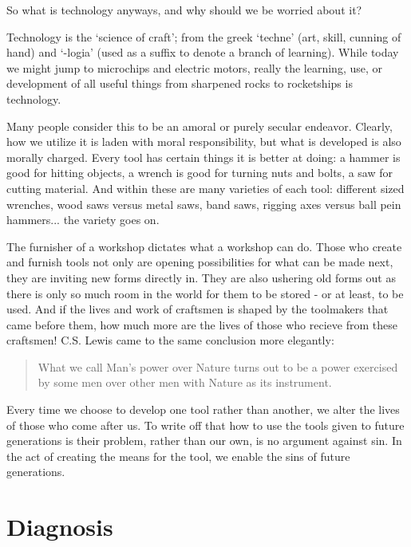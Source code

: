 \documentclass[letterpaper]{article}
\begin{document}
So what is technology anyways, and why should we be worried about it?

Technology is the `science of craft'; from the greek `techne' (art, skill, cunning of hand) and `-logia' (used as a suffix to denote a branch of learning). While today we might jump to microchips and electric motors, really the learning, use, or development of all useful things from sharpened rocks to rocketships is technology.

Many people consider this to be an amoral or purely secular endeavor. Clearly, how we utilize it is laden with moral responsibility, but what is developed is also morally charged. Every tool has certain things it is better at doing: a hammer is good for hitting objects, a wrench is good for turning nuts and bolts, a saw for cutting material. And within these are many varieties of each tool: different sized wrenches, wood saws versus metal saws, band saws, rigging axes versus ball pein hammers... the variety goes on.

The furnisher of a workshop dictates what a workshop can do. Those who create and furnish tools not only are opening possibilities for what can be made next, they are inviting new forms directly in. They are also ushering old forms out as there is only so much room in the world for them to be stored - or at least, to be used. And if the lives and work of craftsmen is shaped by the toolmakers that came before them, how much more are the lives of those who recieve from these craftsmen! C.S. Lewis came to the same conclusion more elegantly:

\begin{quote}
  What we call Man's power over Nature turns out to be a power exercised by some men over other men with Nature as its instrument.
\end{quote}

Every time we choose to develop one tool rather than another, we alter the lives of those who come after us. To write off that how to use the tools given to future generations is their problem, rather than our own, is no argument against sin. In the act of creating the means for the tool, we enable the sins of future generations.


\section{Diagnosis}
\end{document}

